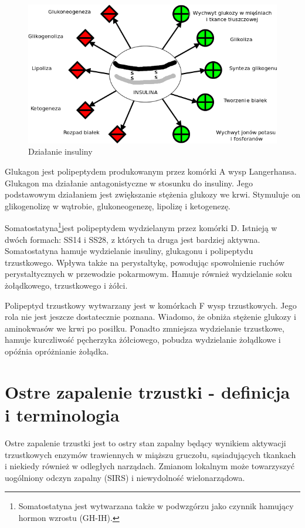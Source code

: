 \documentclass[a4paper, 12pt]{report}
\begin{document}
\begin{figure}[h]
\centering
\includegraphics[scale=0.5]{Insulina_diag2}
\caption{Działanie insuliny}
\end{figure}

Glukagon jest polipeptydem produkowanym przez komórki A wysp
Langerhansa. Glukagon ma działanie antagonistyczne w stosunku do
insuliny. Jego podstawowym działaniem jest zwiększanie stężenia
glukozy we krwi. Stymuluje on glikogenolizę w wątrobie,
glukoneogenezę, lipolizę i ketogenezę.

Somatostatyna\footnote{ Somatostatyna jest wytwarzana także
w podwzgórzu jako czynnik hamujący hormon wzrostu (GH-IH).}jest
polipeptydem wydzielanym
przez komórki D. Istnieją w dwóch formach: SS14 i SS28, z których ta druga
jest bardziej aktywna. Somatostatyna hamuje wydzielanie insuliny,
glukagonu i polipeptydu trzustkowego. Wpływa także na perystaltykę,
powodując spowolnienie ruchów perystaltycznych w przewodzie
pokarmowym. Hamuje również wydzielanie soku żołądkowego, trzustkowego i
żółci.

Polipeptyd trzustkowy wytwarzany jest w komórkach F wysp trzustkowych. Jego
rola nie jest jeszcze dostatecznie poznana. Wiadomo, że obniża
stężenie glukozy i aminokwasów we krwi po posiłku. Ponadto zmniejsza
wydzielanie trzustkowe, hamuje kurczliwość pęcherzyka żółciowego,
pobudza wydzielanie żołądkowe i opóźnia opróżnianie żołądka.

\chapter{Ostre zapalenie trzustki - definicja i terminologia}

Ostre zapalenie trzustki jest to ostry stan zapalny będący wynikiem
aktywacji trzustkowych enzymów trawiennych w miąższu gruczołu,
sąsiadujących tkankach i niekiedy również w odległych narządach.
Zmianom lokalnym może towarzyszyć uogólniony odczyn zapalny (SIRS) i
niewydolność wielonarządowa. 
\end{document}
